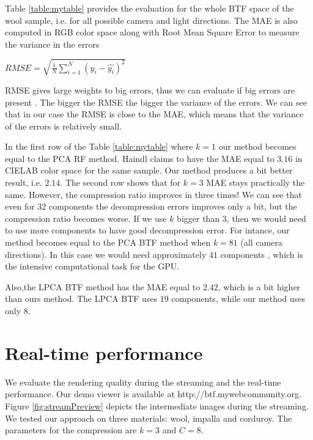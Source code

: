  Table \ref{table:mytable} provides the evaluation for the whole BTF space of the wool sample, i.e. for all possible camera and light directions.
 The MAE is also computed in RGB color space along with Root Mean Square Error to measure the variance in the errors
 
 {\centering $RMSE = \sqrt{\frac{1}{N}\sum_{i=1}^{N}(y_i-\hat{y_i} )^2}$\\}

 RMSE gives large weights to big errors, thus we can evaluate if big errors are present \cite{rmse}.
 The bigger the RMSE the bigger the variance of the errors. We can see that in our case the RMSE is close to the MAE, which means that the variance of the errors is relatively small.
 
In the first row of the  Table \ref{table:mytable} where $k=1$ our method becomes equal to the PCA RF \cite{haindl} method.
Haindl \cite{haindl} claims to have the MAE equal to $3.16$ in CIELAB color space for the same sample.
 Our method produces a bit better result, i.e. $2.14$. 
 The second row shows that for  $k=3$ MAE stays practically the same. 
 However, the compression ratio improves in three times!
 We can see that even for $32$ components the decompression errors improves only a bit, but the compression ratio becomes worse.
 If we use $k$ bigger than $3$, then we would need to use more components to have good decompression error.
 For intance, our method becomes equal to the PCA BTF \cite{haindl} method when $k=81$ (all camera directions). 
 In this case we would need approximately $41$ components \cite{haindl}, which is the intensive computational task for the GPU.
 
 Also,the LPCA BTF \cite{haindl} method has the MAE equal to $2.42$, which is a bit higher than ours method. 
 The LPCA BTF uses $19$ components, while our method uses only $8$.
 
 

\section{Real-time performance}
\label{section:eval_streaming}

We evaluate the rendering quality during the streaming and the real-time performance.
Our demo viewer is available at  http://btf.mywebcommunity.org. 
Figure \ref{fig:streamPreview} depicts the intermediate images during the streaming.
We tested our approach on three materials: wool, impalla and corduroy.
The parameters for the compression are $k=3$ and $C=8$.

